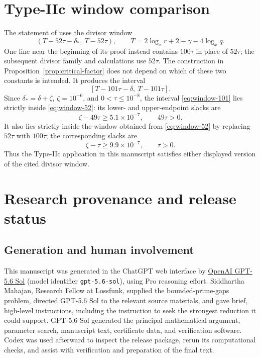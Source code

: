\documentclass[11pt,reqno]{amsart}
\theoremstyle{definition}
\theoremstyle{remark}
\numberwithin{equation}{section}
\begin{document}
\section{Type-IIc window comparison}\label{app:typeIIc-window}
The statement of \cite[Lemma~6]{Stadlmann26} uses the divisor window
\begin{equation}\label{eq:window-52}
 (T-52\tau-\delta_*,\ T-52\tau),
 \qquad T=2\log_xr+2-\gamma-4\log_xq.
\end{equation}
One line near the beginning of its proof instead contains $100\tau$ in
place of $52\tau$; the subsequent divisor family and calculations use
$52\tau$. The construction in Proposition~\ref{prop:critical-factor}
does not depend on which of these two constants is intended. It produces
the interval
\begin{equation}\label{eq:window-101}
 [T-101\tau-\delta,\ T-101\tau].
\end{equation}
Since $\delta_*=\delta+\zeta$, $\zeta=10^{-6}$, and
$0<\tau\le10^{-8}$, the interval \eqref{eq:window-101} lies strictly
inside \eqref{eq:window-52}: its lower- and upper-endpoint slacks are
\[
 \zeta-49\tau\ge5.1\times10^{-7},
 \qquad 49\tau>0.
\]
It also lies strictly inside the window obtained from
\eqref{eq:window-52} by replacing $52\tau$ with $100\tau$; the
corresponding slacks are
\[
 \zeta-\tau\ge9.9\times10^{-7},
 \qquad \tau>0.
\]
Thus the Type-IIc application in this manuscript satisfies either
displayed version of the cited divisor window.

\section{Research provenance and release status}
\label{app:provenance}

\subsection{Generation and human involvement}
This manuscript was generated in the ChatGPT web interface by
\href{https://developers.openai.com/api/docs/models/gpt-5.6-sol}
{OpenAI GPT-5.6 Sol} (model identifier \texttt{gpt-5.6-sol}), using Pro
reasoning effort. Siddhartha Mahajan, Research Fellow at Lossfunk, supplied
the bounded-prime-gaps problem, directed GPT-5.6 Sol to the relevant source
materials, and gave brief, high-level instructions,
including the instruction to seek the strongest reduction it could support.
GPT-5.6 Sol generated the principal mathematical argument, parameter search,
manuscript text, certificate data, and verification software. Codex was used
afterward to inspect the release package, rerun its computational checks, and
assist with verification and preparation of the final text.
\end{document}
